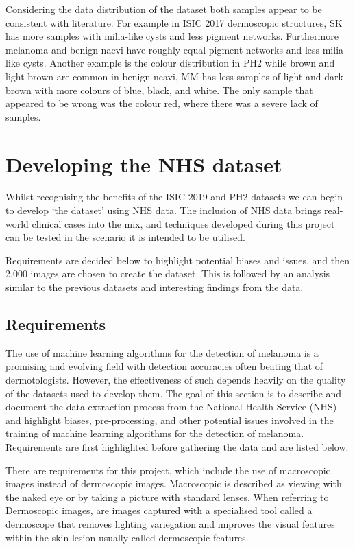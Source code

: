 Considering the data distribution of the dataset both samples appear to be consistent with literature. For example in ISIC 2017 dermoscopic structures, SK has more samples with milia-like cysts and less pigment networks. Furthermore melanoma and benign naevi have roughly equal pigment networks and less milia-like cysts. Another example is the colour distribution in PH2 while brown and light brown are common in benign neavi, MM has less samples of light and dark brown with more colours of blue, black, and white. The only sample that appeared to be wrong was the colour red, where there was a severe lack of samples.


\section{Developing the NHS dataset}
Whilst recognising the benefits of the ISIC 2019 and PH2 datasets we can begin to develop `the dataset' using NHS data. The inclusion of NHS data brings real-world clinical cases into the mix, and techniques developed during this project can be tested in the scenario it is intended to be utilised.

Requirements are decided below to highlight potential biases and issues, and then 2,000 images are chosen to create the dataset. This is followed by an analysis similar to the previous datasets and interesting findings from the data.

\subsection{Requirements}
The use of machine learning algorithms for the detection of melanoma is a promising and evolving field with detection accuracies often beating that of dermotologists\cite{Andre2017}. However, the effectiveness of such depends heavily on the quality of the datasets used to develop them\cite{Tae2019}. The goal of this section is to describe and document the data extraction process from the National Health Service (NHS) and highlight biases, pre-processing, and other potential issues involved in the training of machine learning algorithms for the detection of melanoma. Requirements are first highlighted before gathering the data and are listed below.

There are requirements for this project, which include the use of macroscopic images instead of dermoscopic images. Macroscopic is described as viewing with the naked eye or by taking a picture with standard lenses. When referring to Dermoscopic images, are images captured with a specialised tool called a dermoscope that removes lighting variegation and improves the visual features within the skin lesion usually called dermoscopic features.

